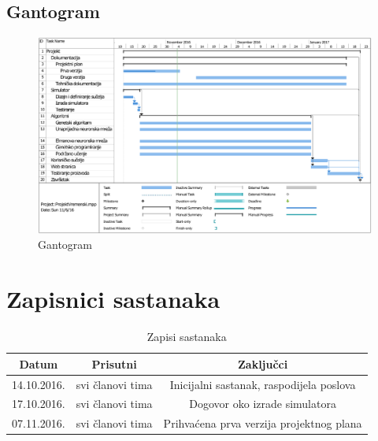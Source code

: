 \documentclass[times, utf8, numeric]{fer}
\begin{document}
\begin{landscape}
\section{Gantogram}
\begin{figure}[H]
\includegraphics[scale=0.725]{ProjektVremenski.pdf}
\caption{Gantogram}
\end{figure}
\end{landscape}

\section{Zapisnici sastanaka}
\begin{table}[H]
\centering
 \begin{tabular}{||c c c||} 
 \hline
 Datum & Prisutni & Zaključci\\ [0.5ex] 
 \hline\hline
 14.10.2016. & svi članovi tima & Inicijalni sastanak, raspodijela poslova\\
 17.10.2016. & svi članovi tima & Dogovor oko izrade simulatora\\
 07.11.2016. & svi članovi tima & Prihvaćena prva verzija projektnog plana\\
 \hline
 \end{tabular}
 \caption{Zapisi sastanaka}
\end{table}
\end{document}
